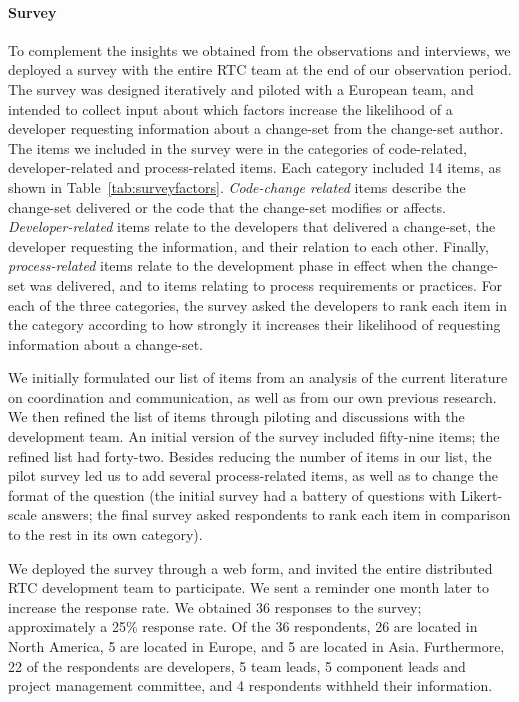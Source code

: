 \paragraph{Survey}
To complement the insights we obtained from the observations and interviews, we deployed a survey with the entire RTC team at the end of our observation period. The survey was designed iteratively and piloted with a European team, and intended to collect input about which factors increase the likelihood of a developer requesting information about a change-set from the change-set author. The items we included in the survey were in the categories of code-related, developer-related and process-related items. Each category included 14 items, as shown in Table~\ref{tab:surveyfactors}. \emph{Code-change related} items describe the change-set delivered or the code that the change-set modifies or affects. \emph{Developer-related} items relate to
the developers that delivered a change-set, the developer requesting the
information, and their relation to each other. Finally, \emph{process-related} items relate to the development phase in effect when the change-set was delivered, and to items relating to process requirements or practices. For each of the three categories, the survey asked the developers to rank each item in the category according to how strongly it increases their likelihood of requesting information about a change-set. 

We initially formulated our list of items from an analysis of the current literature on coordination and communication, as well as from our own previous research. We then refined the list of items through piloting and discussions with the development team. An initial version of the survey included fifty-nine items; the refined list had forty-two. Besides reducing the number of items in our list, the pilot survey led us to add several process-related items, as well as to change the format of the question (the initial survey had a battery of questions with Likert-scale answers; the final survey asked respondents to rank each item in comparison to the rest in its own category).

We deployed the survey through a web form, and invited the entire distributed RTC development team to participate. We sent a reminder one month later to increase the response rate. We obtained 36 responses to the survey; approximately a 25\% response rate.
Of the 36 respondents, 26 are located in North America, 5 are located in Europe, and 5 are located in Asia. Furthermore, 22 of the respondents are developers, 5 team leads, 5 component leads and project management committee, and 4 respondents withheld their information.

